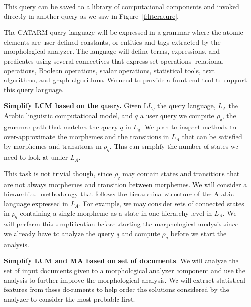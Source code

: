 \documentclass[12pt]{article}
\begin{document}
This query can be saved to a library of computational components
and invoked directly in another query 
as we saw in Figure~\ref{f:literature}.

\begin{figure}
\end{figure}

The CATARM query language will be expressed in a grammar 
where the atomic elements are user defined constants, or
entities and tags extracted by the morphological analyzer. 
The language will define terms, expressions, and predicates
using several connectives that express set operations, 
relational operations, Boolean operations, scalar operations, 
statistical tools, text algorithms, and graph algorithms. 
We need to provide a front end tool to support this query
language.

{\bf Simplify LCM based on the query.}
Given
L$L_q$ the query language, 
$L_A$ the Arabic linguistic
computational model, and  $q$ a user query
we compute $\rho_q$, the grammar path that matches 
the query $q$ in $L_q$. 
We plan to inspect methods to over-approximate 
the morphemes and the transitions in $L_A$ 
that can be satisfied by morphemes and transitions
in $\rho_q$. 
This can simplify the number of states we need to 
look at under $L_A$. 

This task is not trivial though, since $\rho_q$ may contain
states and transitions that are not always morphemes and 
transition between morphemes. 
We will consider a hierarchical methodology that follows 
the hierarchical structure of the Arabic language expressed
in $L_A$. For example,
we may consider sets of connected states in $\rho_q$ 
containing a single morpheme as a state in one hierarchy level 
in $L_A$.
We will perform this simplification before starting the 
morphological analysis since we already have to analyze
the query $q$ and compute $\rho_q$ before we start
the analysis. 

{\bf Simplify LCM and MA based on set of documents.}
We will analyze the set of input documents given to a
morphological analyzer component and use the analysis
to further improve the morphological analysis. 
We will extract statistical features from these documents 
to help order the solutions considered by the analyzer
to consider the most probable first. 
\end{document}

